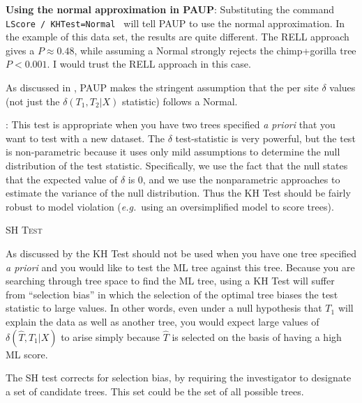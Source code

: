 \documentclass[11pt]{article}
\renewcommand{\section}[2]{%
\bigskip
\begin{center}
\begin{Large}
\normalfont\scshape #2
\medskip
\end{Large}
\end{center}}
\renewcommand{\subsection}[1]{%
\noindent{\large\scshape \underline{#1}}:}
\renewcommand{\subsubsection}[1]{%
\noindent\textbf{#1}:}
\begin{document}
\subsubsection{Using the normal approximation in PAUP} Substituting the command {\tt LScore / KHTest=Normal }	 will tell PAUP to use the normal approximation.
In the example of this data set, the results are quite different.
The RELL approach gives a $P \approx 0.48$, while assuming a Normal strongly rejects the chimp+gorilla tree $P < 0.001$.
I would trust the RELL approach in this case.

As discussed in \citet{GoldmanAR2000}, PAUP makes the stringent assumption that the per site $\delta$ values (not just the $\delta\left(T_1,T_2|X\right)$ statistic) follows a Normal.

\subsection{Summary of the KH Test} This test is appropriate when you have two trees specified {\em a priori} that you want to test with a new dataset. 
The $\delta$ test-statistic is very powerful, but the test is non-parametric because it uses only mild assumptions to determine the null distribution of the test statistic. 
Specifically, we use the fact that the null states that the expected value of $\delta$ is 0, and we use the nonparametric approaches to estimate the variance of the null distribution.
Thus the KH Test should be fairly robust to model violation ({\em e.g.}~using an oversimplified model to score trees).

\newpage
\section*{SH Test \citep{ShimodairaH1999}}
As discussed by \citet{GoldmanAR2000} the KH Test should not be used when you have one tree specified {\em a priori} and you would like to test the ML tree against this tree.
Because you are searching through tree space to find the ML tree, using a KH Test will suffer from ``selection bias'' in which the selection of the optimal tree biases the test statistic to large values.
In other words, even under a null hypothesis that $T_1$ will explain the data as well as another tree, you would expect large values of $\delta(\hat{T}, T_1|X)$ to arise simply because $\hat{T}$ is selected on the basis of having a high ML score.

The SH test corrects for selection bias, by requiring the investigator to designate a set of candidate trees. 
This set could be the set of all possible trees.
\end{document}
